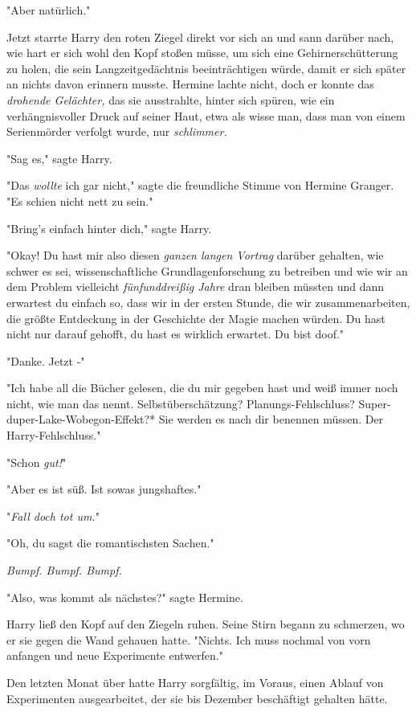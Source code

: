 {"Aber natürlich."

Jetzt starrte Harry den roten Ziegel direkt vor sich an und sann darüber nach, wie hart er sich wohl den Kopf stoßen müsse, um sich eine Gehirnerschütterung zu holen, die sein Langzeitgedächtnis beeinträchtigen würde, damit er sich später an nichts davon erinnern musste. Hermine lachte nicht, doch er konnte das \emph{drohende Gelächter,} das sie ausstrahlte, hinter sich spüren, wie ein verhängnisvoller Druck auf seiner Haut, etwa als wisse man, dass man von einem Serienmörder verfolgt wurde, nur \emph{schlimmer.}

"Sag es," sagte Harry.

"Das \emph{wollte} ich gar nicht," sagte die freundliche Stimme von Hermine Granger. "Es schien nicht nett zu sein."

"Bring's einfach hinter dich," sagte Harry.

"Okay! Du hast mir also diesen \emph{ganzen langen Vortrag} darüber gehalten, wie schwer es sei, wissenschaftliche Grundlagenforschung zu betreiben und wie wir an dem Problem vielleicht \emph{fünfunddreißig Jahre} dran bleiben müssten und dann erwartest du einfach so, dass wir in der ersten Stunde, die wir zusammenarbeiten, die größte Entdeckung in der Geschichte der Magie machen würden. Du hast nicht nur darauf gehofft, du hast es wirklich erwartet. Du bist doof."

"Danke. Jetzt -"

"Ich habe all die Bücher gelesen, die du mir gegeben hast und weiß immer noch nicht, wie man das nennt. Selbstüberschätzung? Planungs-Fehlschluss? Super-duper-Lake-Wobegon-Effekt?* Sie werden es nach dir benennen müssen. Der Harry-Fehlschluss."

"Schon \emph{gut!}"

"Aber es ist süß. Ist sowas jungshaftes."

"\emph{Fall doch tot um.}"

"Oh, du sagst die romantischsten Sachen."

\emph{Bumpf. Bumpf. Bumpf.}

"Also, was kommt als nächstes?" sagte Hermine.

Harry ließ den Kopf auf den Ziegeln ruhen. Seine Stirn begann zu schmerzen, wo er sie gegen die Wand gehauen hatte. "Nichts. Ich muss nochmal von vorn anfangen und neue Experimente entwerfen."

Den letzten Monat über hatte Harry sorgfältig, im Voraus, einen Ablauf von Experimenten ausgearbeitet, der sie bis Dezember beschäftigt gehalten hätte.

}
